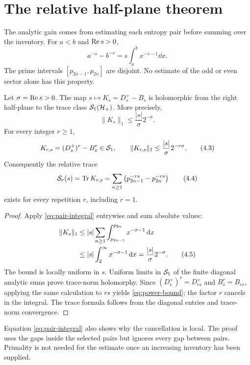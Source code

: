 \section{The relative half-plane theorem}
\label{sec:relative}

The analytic gain comes from estimating each entropy pair before summing over
the inventory.  For $a<b$ and $\operatorname{Re} s>0$,
\[
 a^{-s}-b^{-s}=s\int_a^b x^{-s-1}\dd x.        \tag{4.1}
\]
The prime intervals $[p_{2n-1},p_{2n}]$ are disjoint.  No estimate of the odd
or even sector alone has this property.

\begin{theorem}
\label{thm:trace-class}
Let $\sigma=\operatorname{Re} s>0$.  The map
$s\mapsto K_s=D_s^+-B_s$ is holomorphic from the right half-plane to the trace
class $\mathcal S_1(\mathcal H_+)$.  More precisely,
\[
 \|K_s\|_1
 \le \frac{|s|}{\sigma}2^{-\sigma}.           \tag{4.2}
\]
For every integer $r\ge1$,
\[
 K_{r,s}=(D_s^+)^r-B_s^r\in\mathcal S_1,
 \qquad
 \|K_{r,s}\|_1
 \le \frac{|s|}{\sigma}2^{-r\sigma}.          \tag{4.3}
 \label{eq:power-bound}
\]
Consequently the relative trace
\[
 \mathcal S_r(s)=\operatorname{Tr} K_{r,s}
 =\sum_{n\ge1}\left(p_{2n-1}^{-rs}-p_{2n}^{-rs}\right)             \tag{4.4}
\]
exists for every repetition $r$, including $r=1$.
\end{theorem}

\begin{proof}
Apply \cref{eq:pair-integral} entrywise and sum absolute values:
\begin{align}
 \|K_s\|_1
 &\le |s|\sum_{n\ge1}\int_{p_{2n-1}}^{p_{2n}}
                       x^{-\sigma-1}\,\mathrm d x \notag\\
 &\le |s|\int_2^\infty x^{-\sigma-1}\,\mathrm d x
  =\frac{|s|}{\sigma}2^{-\sigma}.             \tag{4.5}
 \label{eq:pair-integral}
\end{align}
The bound is locally uniform in $s$.  Uniform limits in $\mathcal S_1$ of the finite
diagonal analytic sums prove trace-norm holomorphy.  Since
$(D_s^+)^r=D_{rs}^+$ and $B_s^r=B_{rs}$, applying the same calculation to
$rs$ yields \cref{eq:power-bound}; the factor $r$ cancels in the integral.
The trace formula follows from the diagonal entries and trace-norm convergence.
\end{proof}

Equation \eqref{eq:pair-integral} also shows why the cancellation is local.
The proof uses the gaps inside the selected pairs but ignores every gap between
pairs.  Primality is not needed for the estimate once an increasing inventory
has been supplied.

